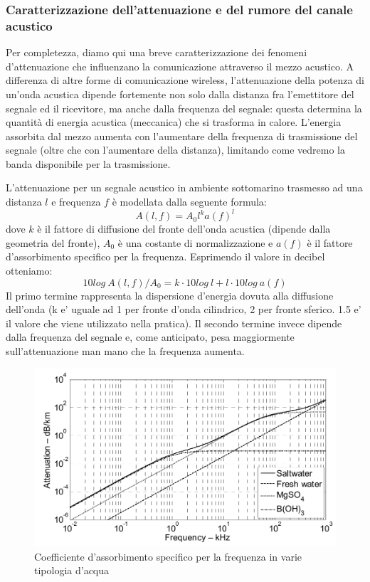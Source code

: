 \documentclass[Lau,binding=0.6cm]{sapthesis}
\begin{document}
\subsubsection{Caratterizzazione dell'attenuazione e del rumore del canale acustico}
\par
Per completezza, diamo qui una breve caratterizzazione dei fenomeni d'attenuazione che influenzano la comunicazione attraverso il mezzo acustico. A differenza di altre forme di comunicazione wireless, l'attenuazione della potenza di un'onda acustica dipende fortemente non solo dalla distanza fra l'emettitore del segnale ed il ricevitore, ma anche dalla frequenza del segnale: questa determina la quantità di energia acustica (meccanica) che si trasforma in calore. L'energia assorbita dal mezzo aumenta con l'aumentare della frequenza di trasmissione del segnale (oltre che con l'aumentare della distanza), limitando come vedremo la banda disponibile per la trasmissione.

L'attenuazione per un segnale acustico in ambiente sottomarino trasmesso ad una distanza $l$ e frequenza $f$ è modellata dalla seguente formula:
\[A(l, f) = A_0 l^k a(f)^l\]
dove $k$ è il fattore di diffusione del fronte dell'onda acustica (dipende dalla geometria del fronte), $A_0$ è una costante di normalizzazione e $a(f)$ è il fattore d'assorbimento specifico per la frequenza.
Esprimendo il valore in decibel otteniamo:
\[10log\ A(l, f)/A_0 = k \cdot 10log\ l + l \cdot 10log\ a(f)\]
Il primo termine rappresenta la dispersione d'energia dovuta alla diffusione dell'onda (k e' uguale ad 1 per fronte d'onda cilindrico, 2 per fronte sferico. 1.5 e' il valore che viene utilizzato nella pratica). Il secondo termine invece dipende dalla frequenza del segnale e, come anticipato, pesa maggiormente sull'attenuazione man mano che la frequenza aumenta.

\begin{figure}[H]
    \centering
    \includegraphics[scale=1.4]{waterabsorption.jpeg}
    \caption{Coefficiente d'assorbimento specifico per la frequenza in varie tipologia d'acqua}
\end{figure}
\end{document}
